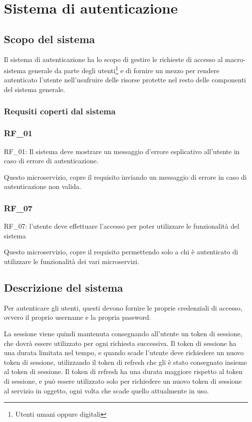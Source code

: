 \chapter{Sistema di autenticazione}


\section{Scopo del sistema}

Il sistema di autenticazione ha lo scopo di gestire le richieste di accesso al macro-sistema generale da parte degli utenti\footnote{Utenti umani oppure digitali} e di fornire un mezzo per rendere autenticato l'utente nell'usufruire delle risorse protette nel resto delle componenti del sistema generale.

\subsection{Requsiti coperti dal sistema}

\subsection{RF\_01}
RF\_01: Il sistema deve mostrare un messaggio d'errore esplicativo all'utente in caso di errore di autenticazione.

Questo microservizio, copre il requisito inviando un messaggio di errore in caso di autenticazione non valida.

\subsection{RF\_07}
RF\_07: l'utente deve effettuare l'accesso per poter utilizzare le funzionalità del sistema

Questo microservizio, copre il requisito permettendo solo a chi è autenticato di utilizzare le funzionalità dei vari microservizi.


\section{Descrizione del sistema}

Per autenticare gli utenti, questi devono fornire le proprie credenziali di accesso, ovvero il proprio username e la propria password.

La sessione viene quindi mantenuta consegnando all'utente un token di sessione, che dovrà essere utilizzato per ogni richiesta successiva. Il token di sessione ha una durata limitata nel tempo, e quando scade l'utente deve richiedere un nuovo token di sessione, utilizzando il token di refresh che gli è stato consegnato insieme al token di sessione. Il token di refresh ha una durata maggiore rispetto al token di sessione, e può essere utilizzato solo per richiedere un nuovo token di sessione al servizio in oggetto, ogni volta che scade quello attualmente in uso.

